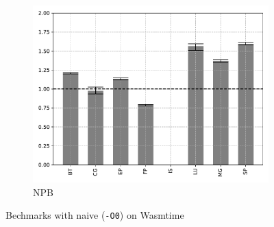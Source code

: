 \begin{figure}
\begin{subfigure}[t]{.45\textwidth}
        \includegraphics[width=\textwidth]
        {Images/6.1.RQ1/npb-wasmtime-naive.pdf}
        \caption{NPB}
    \end{subfigure}
    \caption{Bechmarks with naive (\texttt{-O0}) on Wasmtime}
    \label{fig:rq1-wasmtime-naive}
\end{figure}

